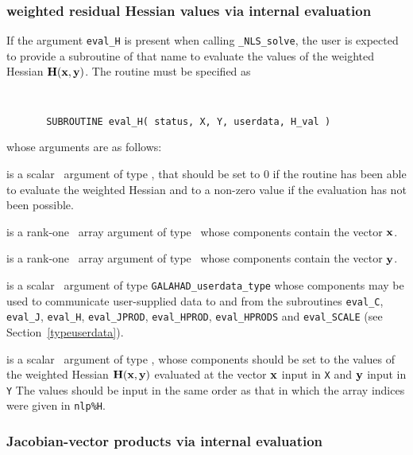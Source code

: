 \documentclass{galahad}
\newcommand{\packagename}{NLS}
\newcommand{\fullpackagename}{\libraryname\_\packagename}
\newcommand{\solver}{{\tt \fullpackagename\_solve}}
\begin{document}

\subsubsection{weighted residual Hessian values via internal evaluation\label{hfv}}

If the argument {\tt eval\_H} is present when calling \solver, the
user is expected to provide a subroutine of that name to evaluate the
values of the weighted Hessian ${\mathbf{H}}({\mathbf{x}},{\mathbf{y}})$.
The routine must be specified as

\def\baselinestretch{0.8}
{\tt
\begin{verbatim}
       SUBROUTINE eval_H( status, X, Y, userdata, H_val )
\end{verbatim} }
\def\baselinestretch{1.0}
\noindent whose arguments are as follows:

\begin{description}
 is a scalar \intentout\ argument of type \integer,
that should be set to 0 if the routine has been able to evaluate
the weighted Hessian
and to a non-zero value if the evaluation has not been possible.

 is a rank-one \intentin\ array argument of type \realdp\
whose components contain the vector ${\mathbf{x}}$.

 is a rank-one \intentin\ array argument of type \realdp\
whose components contain the vector ${\mathbf{y}}$.

 is a scalar \intentinout\ argument of type
{\tt GALAHAD\_userdata\_type} whose components may be used
to communicate user-supplied data to and from the subroutines
{\tt eval\_C}, {\tt eval\_J}, {\tt eval\_H}, {\tt eval\_JPROD},
{\tt eval\_HPROD}, {\tt eval\_HPRODS} and {\tt eval\_SCALE}
(see Section~\ref{typeuserdata}).

 is a scalar \intentout\ argument of type \realdp,
whose components should be set to the values
of the weighted Hessian ${\mathbf{H}}({\mathbf{x}},{\mathbf{y}})$
evaluated at the vector ${\mathbf{x}}$ input in {\tt X}
and ${\mathbf{y}}$ input in {\tt Y} The values should
be input in the same order as that in which the array indices were
given in {\tt nlp\%H}.

\end{description}


\subsubsection{Jacobian-vector products via internal evaluation\label{jvfv}}
\end{document}
